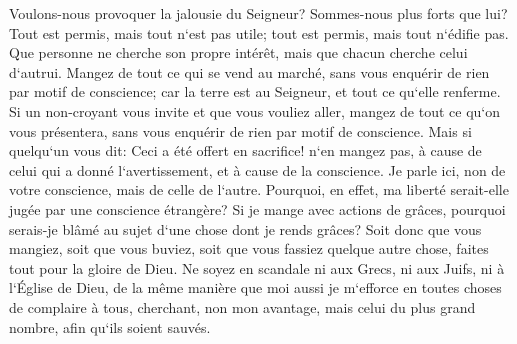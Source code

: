\verse Voulons-nous provoquer la jalousie du Seigneur? Sommes-nous plus forts que lui? 
\verse Tout est permis, mais tout n`est pas utile; tout est permis, mais tout n`édifie pas. 
\verse Que personne ne cherche son propre intérêt, mais que chacun cherche celui d`autrui. 
\verse Mangez de tout ce qui se vend au marché, sans vous enquérir de rien par motif de conscience; 
\verse car la terre est au Seigneur, et tout ce qu`elle renferme. 
\verse Si un non-croyant vous invite et que vous vouliez aller, mangez de tout ce qu`on vous présentera, sans vous enquérir de rien par motif de conscience. 
\verse Mais si quelqu`un vous dit: Ceci a été offert en sacrifice! n`en mangez pas, à cause de celui qui a donné l`avertissement, et à cause de la conscience. 
\verse Je parle ici, non de votre conscience, mais de celle de l`autre. Pourquoi, en effet, ma liberté serait-elle jugée par une conscience étrangère? 
\verse Si je mange avec actions de grâces, pourquoi serais-je blâmé au sujet d`une chose dont je rends grâces? 
\verse Soit donc que vous mangiez, soit que vous buviez, soit que vous fassiez quelque autre chose, faites tout pour la gloire de Dieu. 
\verse Ne soyez en scandale ni aux Grecs, ni aux Juifs, ni à l`Église de Dieu, 
\verse de la même manière que moi aussi je m`efforce en toutes choses de complaire à tous, cherchant, non mon avantage, mais celui du plus grand nombre, afin qu`ils soient sauvés. 

\chapter{}

